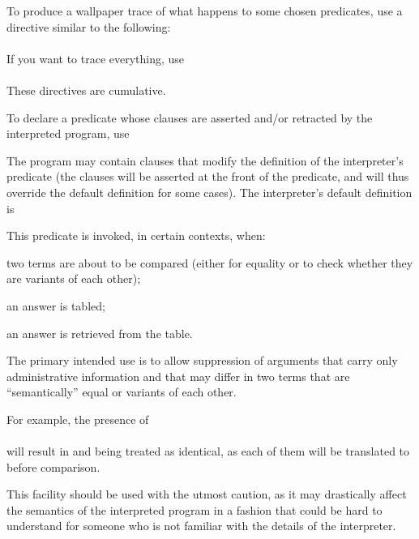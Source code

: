 To produce a wallpaper trace of what happens to some chosen predicates, use a
directive similar to the following:\\
\ind{}\label{dir:trace}\\
If you want to trace everything, use\\
\ind{}\\
These directives are cumulative.



To declare a predicate whose clauses are asserted and/or retracted by the
interpreted program, use\\
\ind{}\label{dir:dynamic}

\vfill %



The program may contain clauses that modify the definition of the
interpreter's predicate  (the clauses will be asserted
at the front of the predicate, and will thus override the default definition
for some cases).  The interpreter's default definition is\\
\ind{}

This predicate is invoked, in certain contexts, when:
\begin{LightItemize}
  \item
    two terms are about to be compared (either for equality or to check
    whether they are variants of each other);
  \item
    an answer is tabled;
  \item
    an answer is retrieved from the table.
\end{LightItemize}

The primary intended use is to allow suppression of arguments that carry only
administrative information and that may differ in two terms that are
``semantically'' equal or variants of each other.

For example, the presence of\\
\ind{}\\
will result in  and  being treated as
identical, as each of them will be translated to  before
comparison.

\begin{Warning}
This facility should be used with the utmost caution, as it may drastically
affect the semantics of the interpreted program in a fashion that could be
hard to understand for someone who is not familiar with the details of the
interpreter.
\end{Warning}
